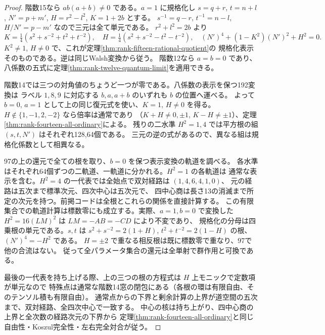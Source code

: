 \begin{proof}
階数15なら $ab(a+b)\ne0$ である。$a=1$ に規格化し
$s=q+r$, $t=n+l$, $N'=p+m'$, $H=r^2-l^2$, $K=1+2b$ とする。
$s^{-1}=q-r$, $t^{-1}=n-l$, $H/N'=p-m'$ なので三元は全て単元である。
$r^2+l^2=2b$ より
\[
 K=\tfrac14(s^2+s^{-2}+t^2+t^{-2}),\quad
 H=\tfrac14(s^2+s^{-2}-t^2-t^{-2}),\quad
 (N')^4+(1-K^2)(N')^2+H^2=0 .
\]
$K^2\ne1$, $H\ne0$ で、これが定理\ref{thm:rank-fifteen-rational-quotient}の
規格化表示そのものである。逆は同じWalsh変換から従う。
階数12なら $a=b=0$ であり、八係数の五式に定理\ref{thm:rank-twelve-quantum-limit}を適用できる。

階数14では三つの対角値のちょうど一つが零である。八係数の表示を保つ192変換は
ラベル $1,8,9$ に対応する $b,a,a+b$ のいずれも $b$ の位置へ運べる。
よって $b=0$, $a=1$ として上の同じ復元式を使い、$K=1$, $H\ne0$ を得る。
$H\notin\{1,-1,2,-2\}$ なら倍率は通常であり
（$K+H\ne0,\pm1$, $K-H\ne\pm1$）、定理\ref{thm:rank-fourteen-all-ordinary}による。
残りの二水準 $H^2=1,4$ では平方根の組 $(s,t,N')$ はそれぞれ128,64個である。
三元の逆の式があるので、異なる組は規格化係数として相異なる。

97の上の還元で全ての根を取り、$b=0$ を保つ表示変換の軌道を調べる。
各水準はそれぞれ64個ずつの二軌道、一軌道に分かれる。$H^2=1$ の各軌道は
通常な表示を含む。$H^2=4$ の一代表では全始点で双対経路は $(1,4,6,4,1,0)$、
元の経路は五次まで標準次元、四次中心は五次元で、
四中心商は長さ13の消滅まで所定の次元を持つ。前掲コードは全根とこれらの関係を直接計算する。
この有限集合での軌道計算は標数零にも成立する。実際、$a=1,b=0$ で変換した
$H^2=16(LM)^2$ は $LM=-AB=-CD$ により不変であり、
規格化の分母は四乗根の単元である。$s,t$ は $s^2+s^{-2}=2(1+H)$,
$t^2+t^{-2}=2(1-H)$ の根、$(N')^4=-H^2$ である。
$H=\pm2$ で重なる相反根は既に標数零で重なり、97で他の合流はない。
従って全パラメータ集合の還元は全単射で群作用と可換である。

最後の一代表を持ち上げる際、上の三つの根の方程式は $H$ 上モニックで定数項が単元なので
特殊点は通常な階数14窓の閉包にある（各根の環は有限自由、そのテンソル積も有限自由）。
通常点からの下界と剰余計算の上界が道空間の五次まで、双対経路、全四次中心で一致する。
中心の核は持ち上がり、四中心商の上界と全次数の経路次元の下界から
定理\ref{thm:rank-fourteen-all-ordinary}と同じ自由性・Koszul完全性・左右完全対合が従う。
\end{proof}
